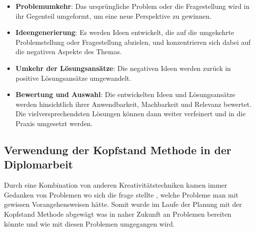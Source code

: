     \begin{itemize}
        \item \textbf{Problemumkehr}: Das ursprüngliche Problem oder die Fragestellung wird in ihr Gegenteil umgeformt, um eine neue Perspektive zu gewinnen.
        
        \item \textbf{Ideengenerierung}: Es werden Ideen entwickelt, die auf die umgekehrte Problemstellung oder Fragestellung abzielen, und konzentrieren sich dabei auf die negativen Aspekte des Themas.
        
        \item \textbf{Umkehr der Lösungsansätze}: Die negativen Ideen werden zurück in positive Lösungsansätze umgewandelt.
        
        \item \textbf{Bewertung und Auswahl}: Die entwickelten Ideen und Lösungsansätze werden hinsichtlich ihrer Anwendbarkeit, Machbarkeit und Relevanz bewertet. Die vielversprechendsten Lösungen können dann weiter verfeinert und in die Praxis umgesetzt werden.
        \end{itemize}

        \subsection{Verwendung der Kopfstand Methode in der Diplomarbeit}
        Durch eine Kombination von anderen Kreativitätstechniken kamen immer Gedanken von Problemen wo sich die frage stellte , welche Probleme man mit gewissen Vorangehensweisen hätte. Somit wurde im Laufe der Planung mit der Kopfstand Methode abgewägt was in naher Zukunft an Problemen bereiten könnte und wie mit diesen Problemen umgegangen wird.  


\newpage

